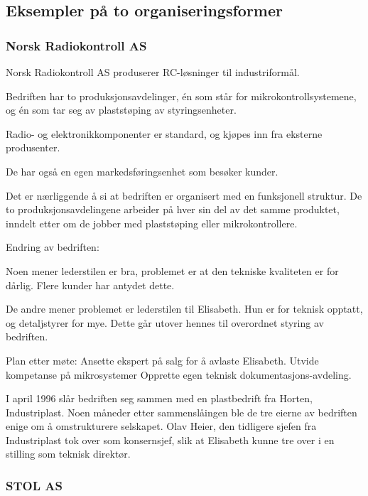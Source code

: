 
\subsection{Eksempler på to organiseringsformer}

\subsubsection{Norsk Radiokontroll AS}


Norsk Radiokontroll AS produserer RC-løsninger til industriformål.

Bedriften har to produksjonsavdelinger, én som står for mikrokontrollsystemene, og én som tar seg av plaststøping av styringsenheter.

Radio- og elektronikkomponenter er standard, og kjøpes inn fra eksterne produsenter.

De har også en egen markedsføringsenhet som besøker kunder.

Det er nærliggende å si at bedriften er organisert med en funksjonell struktur.
De to produksjonsavdelingene arbeider på hver sin del av det samme produktet, inndelt etter om de jobber med plaststøping eller mikrokontrollere.

Endring av bedriften:

Noen mener lederstilen er bra, problemet er at den tekniske kvaliteten er for dårlig.
Flere kunder har antydet dette.

De andre mener problemet er lederstilen til Elisabeth.
Hun er for teknisk opptatt, og detaljstyrer for mye.
Dette går utover hennes til overordnet styring av bedriften.

Plan etter møte:
Ansette ekspert på salg for å avlaste Elisabeth.
Utvide kompetanse på mikrosystemer
Opprette egen teknisk dokumentasjons-avdeling.

I april 1996 slår bedriften seg sammen med en plastbedrift fra Horten, Industriplast.
Noen måneder etter sammenslåingen ble de tre eierne av bedriften enige om å omstrukturere selskapet. Olav Heier, den tidligere sjefen fra Industriplast tok over som konsernsjef, slik at Elisabeth kunne tre over i en stilling som teknisk direktør.


\subsubsection{STOL AS}

